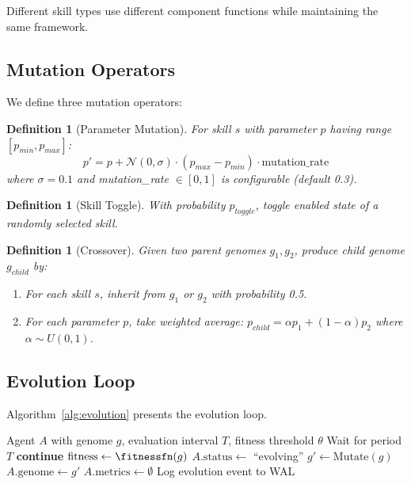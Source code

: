 \documentclass{article}
\newtheorem{definition}[theorem]{Definition}
\begin{document}
Different skill types use different component functions while maintaining the same framework.

\subsection{Mutation Operators}

We define three mutation operators:

\begin{definition}[Parameter Mutation]
For skill $s$ with parameter $p$ having range $[p_{min}, p_{max}]$:
\begin{equation}
p' = p + \mathcal{N}(0, \sigma) \cdot (p_{max} - p_{min}) \cdot \text{mutation\_rate}
\end{equation}
where $\sigma = 0.1$ and mutation\_rate $\in [0, 1]$ is configurable (default 0.3).
\end{definition}

\begin{definition}[Skill Toggle]
With probability $p_{toggle}$, toggle enabled state of a randomly selected skill.
\end{definition}

\begin{definition}[Crossover]
Given two parent genomes $g_1, g_2$, produce child genome $g_{child}$ by:
\begin{enumerate}
    \item For each skill $s$, inherit from $g_1$ or $g_2$ with probability 0.5.
    \item For each parameter $p$, take weighted average: $p_{child} = \alpha p_1 + (1-\alpha) p_2$ where $\alpha \sim U(0, 1)$.
\end{enumerate}
\end{definition}

\subsection{Evolution Loop}

Algorithm~\ref{alg:evolution} presents the evolution loop.

\begin{algorithm}[t]
\caption{Evolution Loop}
\label{alg:evolution}
\begin{algorithmic}[1]
\Require Agent $A$ with genome $g$, evaluation interval $T$, fitness threshold $\theta$
\Loop
    \State Wait for period $T$
        \State \textbf{continue} 
    \EndIf
    \State $\text{fitness} \gets \fitnessfn(g)$
        \State $A.\text{status} \gets$ ``evolving''
        \State $g' \gets \text{Mutate}(g)$
        \State $A.\text{genome} \gets g'$
        \State $A.\text{metrics} \gets \emptyset$ 
        \State Log evolution event to WAL
    \EndIf
\EndLoop
\end{algorithmic}
\end{algorithm}
\end{document}
